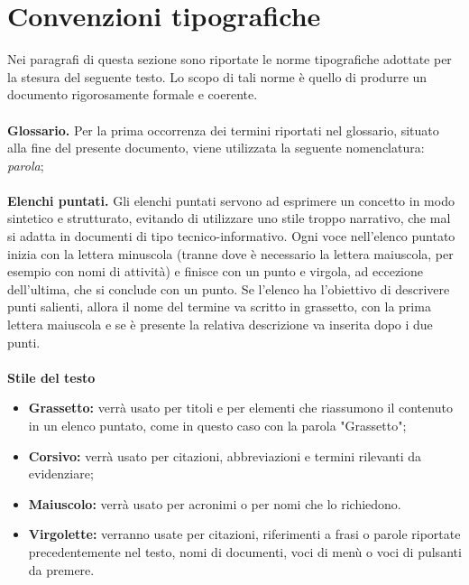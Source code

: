 \section{Convenzioni tipografiche}
Nei paragrafi di questa sezione sono riportate le norme tipografiche adottate per la stesura del seguente testo. Lo scopo di tali norme è quello di produrre un documento rigorosamente formale e coerente.
\\
\\
\textbf{Glossario.} Per la prima occorrenza dei termini riportati nel glossario, situato alla fine del presente documento, viene utilizzata la seguente nomenclatura: \emph{parola}\glsfirstoccur;
\\
\\
\textbf{Elenchi puntati.} Gli elenchi puntati servono ad esprimere un concetto in modo sintetico e strutturato, evitando di utilizzare uno stile troppo narrativo, che mal si adatta in documenti di tipo tecnico-informativo. \newline
Ogni voce nell'elenco puntato inizia con la lettera minuscola (tranne dove è necessario la lettera maiuscola, per esempio con nomi di attività) e finisce con un punto e virgola, ad eccezione dell'ultima, che si conclude con un punto.\newline
Se l'elenco ha l'obiettivo di descrivere punti salienti, allora il nome del termine va scritto in grassetto, con la prima lettera maiuscola e se è presente la relativa descrizione va inserita dopo i due punti. 
\\
\\
\textbf{Stile del testo}
\begin{itemize}
    \item \textbf{Grassetto:} verrà usato per titoli e per elementi che riassumono il contenuto in un elenco puntato, come in questo caso con la parola "Grassetto";
    
    \item \textbf{Corsivo:} verrà usato per citazioni, abbreviazioni e termini rilevanti da evidenziare;
    
    \item \textbf{Maiuscolo:} verrà usato per acronimi o per nomi che lo richiedono.
    
    \item \textbf{Virgolette:} verranno usate per citazioni, riferimenti a frasi o parole riportate precedentemente nel testo, nomi di documenti, voci di menù o voci di pulsanti da premere.
\end{itemize}




